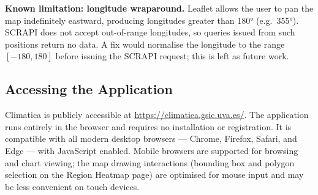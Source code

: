 \textbf{Known limitation: longitude wraparound.} Leaflet allows the user to
pan the map indefinitely eastward, producing longitudes greater than 180°
(e.g.\ 355°). SCRAPI does not accept out-of-range longitudes, so queries
issued from such positions return no data. A fix would normalise the longitude
to the range $[-180, 180]$ before issuing the SCRAPI request; this is left as
future work.

\subsection{Accessing the Application}\label{APP_PROTO_ACCESS}

Climatica is publicly accessible at \url{https://climatica.gsic.uva.es/}.
The application runs entirely in the browser and requires no installation or
registration. It is compatible with all modern desktop browsers --- Chrome,
Firefox, Safari, and Edge --- with JavaScript enabled. Mobile browsers are
supported for browsing and chart viewing; the map drawing interactions
(bounding box and polygon selection on the Region Heatmap page) are optimised
for mouse input and may be less convenient on touch devices.